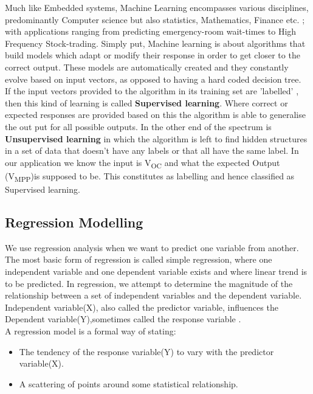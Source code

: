 {Much like Embedded systems, Machine Learning encompasses various disciplines, predominantly Computer science but also statistics, Mathematics, Finance etc. \cite{marsland2011machine}; with applications ranging from predicting emergency-room wait-times \cite{connelly2004discrete} to High Frequency Stock-trading. Simply put, Machine learning is about algorithms that build models which adapt or modify their response in order to get closer to the correct output. These models are automatically created and they constantly evolve based on input vectors, as opposed to having a hard coded decision tree.\\

If the input vectors provided to the algorithm in its training set are 'labelled' , then this kind of learning is called \textbf{Supervised learning}. Where correct or expected responses are provided based on this the algorithm is able to generalise the out put for all possible outputs. In the other end of the spectrum is \textbf{Unsupervised learning} in which the algorithm is left to find hidden structures in a set of data that doesn't have any labels or that all have the same label. In our application we know the input is V\textsubscript{OC} and what the expected Output (V\textsubscript{MPP})is supposed to be. This constitutes as  labelling and hence classified as Supervised learning.
 
\subsection{Regression Modelling }

We use regression analysis when we want to predict one variable from another. The most basic form of regression is called simple regression, where one independent variable and one dependent variable exists and where linear trend is to be predicted. In regression, we attempt to determine the magnitude of the relationship between a set of independent variables and the dependent variable. Independent variable(X), also called the predictor variable, influences the Dependent variable(Y),sometimes called the response variable  \cite{lenarreg2006}.\\

A regression model is a formal way of stating:
\begin{itemize}
\item The tendency of the response variable(Y) to vary with the predictor variable(X).
\item A scattering of points around some statistical relationship.
\end {itemize}

}
